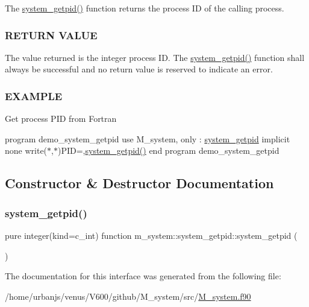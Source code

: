 The \mbox{\hyperlink{interfacem__system_1_1system__getpid_a57e3dc61f201783198e6dbb4ace1527b}{system\+\_\+getpid()}} function returns the process ID of the calling process. \subsubsection*{R\+E\+T\+U\+RN V\+A\+L\+UE}

The value returned is the integer process ID. The \mbox{\hyperlink{interfacem__system_1_1system__getpid_a57e3dc61f201783198e6dbb4ace1527b}{system\+\_\+getpid()}} function shall always be successful and no return value is reserved to indicate an error. \subsubsection*{E\+X\+A\+M\+P\+LE}

Get process P\+ID from Fortran

program demo\+\_\+system\+\_\+getpid use M\+\_\+system, only \+: \mbox{\hyperlink{interfacem__system_1_1system__getpid}{system\+\_\+getpid}} implicit none write($\ast$,$\ast$)\textquotesingle{}P\+ID=\textquotesingle{},\mbox{\hyperlink{interfacem__system_1_1system__getpid_a57e3dc61f201783198e6dbb4ace1527b}{system\+\_\+getpid()}} end program demo\+\_\+system\+\_\+getpid 

\subsection{Constructor \& Destructor Documentation}
\mbox{\label{interfacem__system_1_1system__getpid_a57e3dc61f201783198e6dbb4ace1527b}} 
\subsubsection{\texorpdfstring{system\+\_\+getpid()}{system\_getpid()}}
{\footnotesize\ttfamily pure integer(kind=c\+\_\+int) function m\+\_\+system\+::system\+\_\+getpid\+::system\+\_\+getpid (\begin{DoxyParamCaption}{ }\end{DoxyParamCaption})\hspace{0.3cm}{\ttfamily [private]}}



The documentation for this interface was generated from the following file\+:\begin{DoxyCompactItemize}
\item 
/home/urbanjs/venus/\+V600/github/\+M\+\_\+system/src/\mbox{\hyperlink{M__system_8f90}{M\+\_\+system.\+f90}}\end{DoxyCompactItemize}
